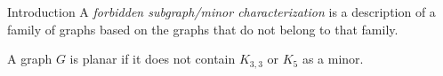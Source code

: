 \begin{frame}{Introduction}
A \emph{forbidden subgraph/minor characterization} is a description of a family of graphs based on the graphs that do not belong to that family.
\vfill
\pause

\begin{example}[Kuratowski]
  A graph $G$ is planar if it does not contain $K_{3,3}$ or $K_5$ as a minor.
\end{example}
\end{frame}

